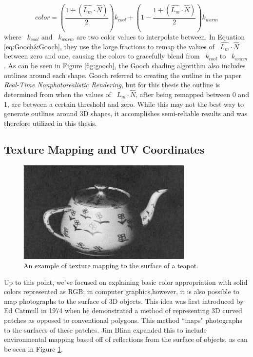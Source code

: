 \begin{equation}
\label{eq:Gooch&Gooch}
color = \left(\frac{1 + (\hat{L_{m}} \cdot \hat{N})}{2}\right) k_{cool} + \left(1-\frac{1 + (\hat{L_{m}} \cdot \hat{N})}{2}\right) k_{warm}
\end{equation}
where ~$k_{cool}$ and ~$k_{warm}$ are two color values to interpolate between. In Equation \ref{eq:Gooch&Gooch}, they use the large fractions to remap the values of ~$\hat{L_{m}} \cdot \hat{N}$ between zero and one, causing the colors to gracefully blend from ~$k_{cool}$ to ~$k_{warm}$.  As can be seen in Figure \ref{fig:gooch}, the Gooch shading algorithm also includes outlines around each shape.  Gooch referred to creating the outline in the paper \textit{Real-Time Nonphotorealistic Rendering}\cite{markosian1997real}, but for this thesis the outline is determined from when the values of ~$\hat{L_{m}} \cdot \hat{N}$, after being remapped between 0 and 1, are between a certain threshold and zero.  While this may not the best way to generate outlines around 3D shapes, it accomplishes semi-reliable results and was therefore utilized in this thesis.
\subsection{Texture Mapping and UV Coordinates}
\label{subsec:TexMap}
\begin{figure}[h]
\centering
\includegraphics[height=2.0in]{figures/flowerteapot.png}
\caption{An example of texture mapping to the surface of a teapot. \cite{blinn1976texture}}
\label{fig:teapot}
\end{figure}
Up to this point, we've focused on explaining basic color appropriation with solid colors represented as RGB; in computer graphics,however, it is also possible to map photographs to the surface of 3D objects.  This idea was first introduced by Ed Catmull in 1974 when he demonstrated a method of representing 3D curved patches as opposed to conventional polygons.  This method ``maps" photographs to the surfaces of these patches\cite{catmull1974subdivision}. Jim Blinn expanded this to include environmental mapping based off of reflections from the surface of objects\cite{blinn1976texture}, as can be seen in Figure \ref{fig:teapot}.

